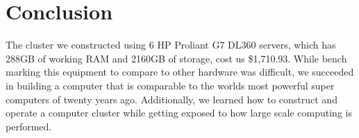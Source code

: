 \documentclass[12pt]{article}
\begin{document}
%
%
\section{Conclusion} 

The cluster we constructed using 6 HP Proliant G7 DL360 servers, which has 288GB of working RAM and 2160GB of storage, cost us \$1,710.93. While bench marking this equipment to compare to other hardware was difficult, we succeeded in building a computer that is comparable to the worlds most powerful super computers of twenty years ago. Additionally, we learned how to construct and operate a computer cluster while getting exposed to how large scale computing is performed.

\newpage


\end{document}
